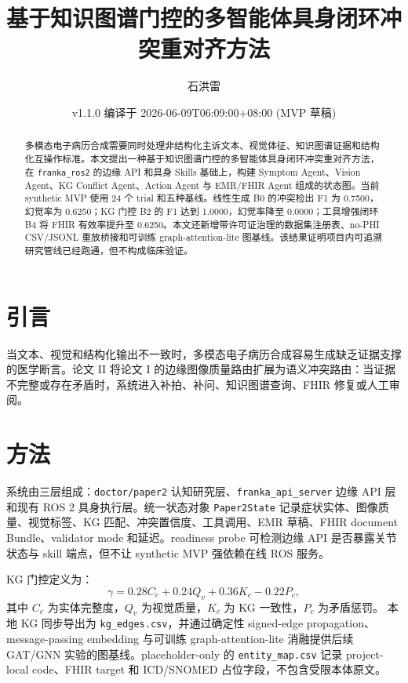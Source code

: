 \documentclass[11pt]{article}
\title{基于知识图谱门控的多智能体具身闭环冲突重对齐方法}
\author{石洪雷}
\date{v1.1.0 编译于 2026-06-09T06:09:00+08:00 (MVP 草稿)}
\begin{document}
\maketitle

\begin{abstract}
多模态电子病历合成需要同时处理非结构化主诉文本、视觉体征、知识图谱证据和结构化互操作标准。本文提出一种基于知识图谱门控的多智能体具身闭环冲突重对齐方法，在 \texttt{franka\_ros2} 的边缘 API 和具身 Skills 基础上，构建 Symptom Agent、Vision Agent、KG Conflict Agent、Action Agent 与 EMR/FHIR Agent 组成的状态图。当前 synthetic MVP 使用 24 个 trial 和五种基线。线性生成 B0 的冲突检出 F1 为 0.7500，幻觉率为 0.6250；KG 门控 B2 的 F1 达到 1.0000，幻觉率降至 0.0000；工具增强闭环 B4 将 FHIR 有效率提升至 0.6250。本文还新增带许可证治理的数据集注册表、no-PHI CSV/JSONL 重放桥接和可训练 graph-attention-lite 图基线。该结果证明项目内可追溯研究管线已经跑通，但不构成临床验证。
\end{abstract}

\section{引言}
当文本、视觉和结构化输出不一致时，多模态电子病历合成容易生成缺乏证据支撑的医学断言。论文 II 将论文 I 的边缘图像质量路由扩展为语义冲突路由：当证据不完整或存在矛盾时，系统进入补拍、补问、知识图谱查询、FHIR 修复或人工审阅。

\section{方法}
系统由三层组成：\texttt{doctor/paper2} 认知研究层、\texttt{franka\_api\_server} 边缘 API 层和现有 ROS 2 具身执行层。统一状态对象 \texttt{Paper2State} 记录症状实体、图像质量、视觉标签、KG 匹配、冲突置信度、工具调用、EMR 草稿、FHIR document Bundle、validator mode 和延迟。readiness probe 可检测边缘 API 是否暴露关节状态与 skill 端点，但不让 synthetic MVP 强依赖在线 ROS 服务。

KG 门控定义为：
\begin{equation}
\gamma = 0.28 C_e + 0.24 Q_v + 0.36 K_c - 0.22 P_c,
\end{equation}
其中 $C_e$ 为实体完整度，$Q_v$ 为视觉质量，$K_c$ 为 KG 一致性，$P_c$ 为矛盾惩罚。
本地 KG 同步导出为 \texttt{kg\_edges.csv}，并通过确定性 signed-edge propagation、message-passing embedding 与可训练 graph-attention-lite 消融提供后续 GAT/GNN 实验的图基线。placeholder-only 的 \texttt{entity\_map.csv} 记录 project-local code、FHIR target 和 ICD/SNOMED 占位字段，不包含受限本体原文。
\end{document}
